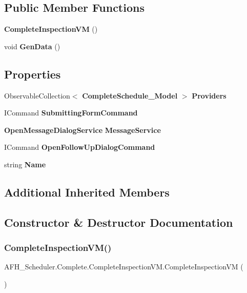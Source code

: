 \subsection*{Public Member Functions}
\begin{DoxyCompactItemize}
\item 
\textbf{ Complete\+Inspection\+VM} ()
\item 
void \textbf{ Gen\+Data} ()
\end{DoxyCompactItemize}
\subsection*{Properties}
\begin{DoxyCompactItemize}
\item 
Observable\+Collection$<$ \textbf{ Complete\+Schedule\+\_\+\+Model} $>$ \textbf{ Providers}\hspace{0.3cm}{\ttfamily  [get, set]}
\item 
I\+Command \textbf{ Submitting\+Form\+Command}\hspace{0.3cm}{\ttfamily  [get]}
\item 
\textbf{ Open\+Message\+Dialog\+Service} \textbf{ Message\+Service}\hspace{0.3cm}{\ttfamily  [get]}
\item 
I\+Command \textbf{ Open\+Follow\+Up\+Dialog\+Command}\hspace{0.3cm}{\ttfamily  [get]}
\item 
string \textbf{ Name}\hspace{0.3cm}{\ttfamily  [get]}
\end{DoxyCompactItemize}
\subsection*{Additional Inherited Members}


\subsection{Constructor \& Destructor Documentation}
\mbox{\label{class_a_f_h___scheduler_1_1_complete_1_1_complete_inspection_v_m_af8a680dd8391ff7279873115783ff452}} 
\subsubsection{CompleteInspectionVM()}
{\footnotesize\ttfamily A\+F\+H\+\_\+\+Scheduler.\+Complete.\+Complete\+Inspection\+V\+M.\+Complete\+Inspection\+VM (\begin{DoxyParamCaption}{ }\end{DoxyParamCaption})}



